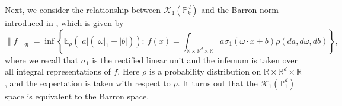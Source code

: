 %   
%  
Next, we consider the relationship between $\mathcal{K}_1(\mathbb{P}_k^d)$ and the Barron norm introduced in \cite{ma2019barron}, which is given by
\begin{equation}\label{barron-norm}
 \|f\|_{\mathcal{B}} = \inf\left\{\mathbb{E}_\rho(|a|(|\omega|_1 + |b|)):~f(x) = \int_{\mathbb{R}\times\mathbb{R}^d\times\mathbb{R}} a\sigma_1(\omega\cdot x + b)\rho(da,d\omega,db)\right\},
\end{equation}
where we recall that $\sigma_1$ is the rectified linear unit and the infemum is taken over all integral representations of $f$. Here $\rho$ is a probability distribution on $\mathbb{R}\times\mathbb{R}^d\times\mathbb{R}$, and the expectation is taken with respect to $\rho$. It turns out that the $\mathcal{K}_1(\mathbb{P}^d_1)$ space is equivalent to the Barron space. 

